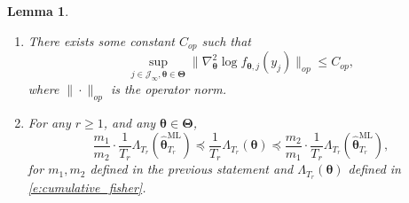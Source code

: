 \documentclass[12pt]{article}
\newcommand{\bfTheta}{\boldsymbol{\Theta}}
\newcommand{\bftheta}{\boldsymbol{\theta}}
\newtheorem{lemma}[theorem]{Lemma}
\begin{document}
\begin{lemma}
\begin{enumerate}
\item{There exists some constant $C_{op}$ such that 
\begin{equation*}
\sup_{j \in \mathcal{J}_{\infty}, \bftheta \in \bfTheta} \| \nabla_{\bftheta}^2 \log f_{\bftheta, j}(y_j) \|_{op} \le C_{op},
\end{equation*}
where $\| \cdot \|_{op}$ is the operator norm.}
\item{For any $r \geq 1$, and any $\bftheta \in \bfTheta$,
\begin{equation*}
\frac{m_1}{m_2} \cdot \frac{1}{T_r} \Lambda_{T_r}(  \hat{\bftheta}_{T_r}^{\mathrm{ML}} ) \preceq 
\frac{1}{T_r} \Lambda_{T_r}(  \bftheta ) 
\preceq
\frac{m_2}{m_1} \cdot \frac{1}{T_r} \Lambda_{T_r}( \hat{\bftheta}_{T_r}^{\mathrm{ML}}  ),
\end{equation*}
for $m_1, m_2$ defined in the previous statement and $\Lambda_{T_r}( \bftheta )$ defined in \eqref{e:cumulative_fisher}.}
\end{enumerate}
\end{lemma}
\end{document}
